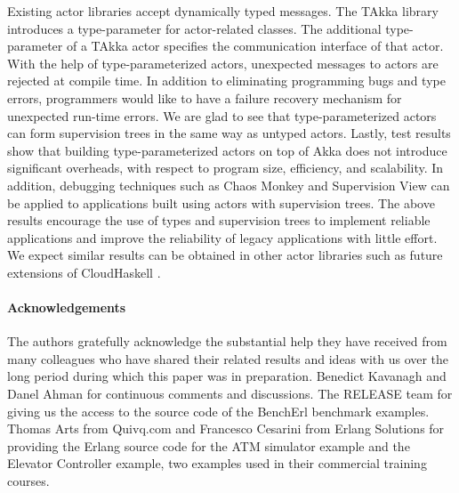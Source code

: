 \documentclass{llncs}
\begin{document}
Existing actor libraries accept dynamically typed messages.  The TAkka
library introduces a type-parameter for actor-related classes. The additional 
type-parameter of a TAkka actor specifies the communication interface of 
that actor.  With the help of type-parameterized actors, unexpected 
messages to actors are rejected at compile time.
In addition to eliminating programming bugs and type errors, 
programmers would like to have a failure recovery mechanism for
unexpected run-time errors.  We are glad to see that type-parameterized 
actors can form supervision trees in the same way as untyped actors.
Lastly, test results show that building type-parameterized actors on top of 
Akka does not introduce significant overheads, with respect to program size,
efficiency, and scalability.  In addition, debugging techniques such 
as Chaos Monkey and Supervision View can be applied to applications built 
using actors with supervision trees.  The above results encourage the use of 
types and supervision trees to implement reliable applications and improve the 
reliability of legacy applications with little effort.  We expect similar 
results can be obtained in other actor libraries such as future extensions 
of CloudHaskell \cite{OTPCloudHaskell}.

\paragraph{Acknowledgements}


The authors gratefully acknowledge the substantial help they have received from 
many colleagues who have shared their related results and ideas with us over 
the long period during which this paper was in preparation.  
Benedict Kavanagh and Danel Ahman for continuous comments and discussions.
The RELEASE team for giving us the access to the source code of the BenchErl 
benchmark examples.  Thomas Arts from Quivq.com and Francesco Cesarini from 
Erlang Solutions for providing the Erlang source code for the ATM simulator 
example and the Elevator Controller example, two examples used in their 
commercial training courses.



%


\end{document}

